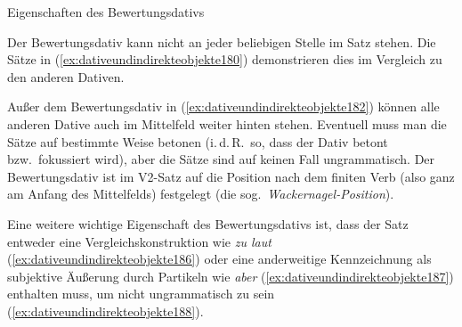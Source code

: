 
\begin{Vertiefung}{Eigenschaften des Bewertungsdativs}

  \label{vert:djwackernagel}

\noindent Der Bewertungsdativ kann nicht an jeder beliebigen Stelle im Satz stehen.
Die Sätze in (\ref{ex:dativeundindirekteobjekte180}) demonstrieren dies im Vergleich zu den anderen Dativen.

\begin{exe}
  \ex\label{ex:dativeundindirekteobjekte180}
  \begin{xlist}
  \end{xlist}
\end{exe}

Außer dem Bewertungsdativ in (\ref{ex:dativeundindirekteobjekte182}) können alle anderen Dative auch im Mittelfeld weiter hinten stehen.
Eventuell muss man die Sätze auf bestimmte Weise betonen (i.\,d.\,R.\ so, dass der Dativ betont bzw.\ fokussiert wird), aber die Sätze sind auf keinen Fall ungrammatisch.
Der Bewertungsdativ ist im V2-Satz auf die Position nach dem finiten Verb (also ganz am Anfang des Mittelfelds) festgelegt (die sog.\ \textit{Wackernagel-Position}).

Eine weitere wichtige Eigenschaft des Bewertungsdativs ist, dass der Satz entweder eine Vergleichskonstruktion wie \textit{zu laut} (\ref{ex:dativeundindirekteobjekte186}) oder eine anderweitige Kennzeichnung als subjektive Äußerung durch Partikeln wie \textit{aber} (\ref{ex:dativeundindirekteobjekte187}) enthalten muss, um nicht ungrammatisch zu sein (\ref{ex:dativeundindirekteobjekte188}).

\begin{exe}
  \ex\label{ex:dativeundindirekteobjekte185}
  \begin{xlist}
  \end{xlist}
\end{exe}

\end{Vertiefung}


